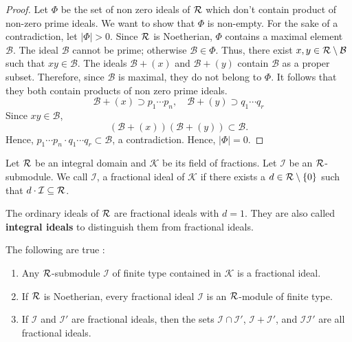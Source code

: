 \begin{proof}
  Let $\Phi$ be the set of non zero ideals of $\mathcal{R}$ which don't contain product of non-zero prime ideals. We want to show that $\Phi$ is non-empty. For the sake of a contradiction, let $|\Phi|>0$. Since $\mathcal{R}$ is Noetherian, $\Phi$ contains a maximal element $\mathcal{B}$. The ideal $\mathcal{B}$ cannot be prime; otherwise $\mathcal{B}\in \Phi$. Thus, there exist $x,y\in \mathcal{R}\setminus\mathcal{B}$ such that $xy\in \mathcal{B}$. The ideals $\mathcal{B}+(x)$ and
   $\mathcal{B}+(y)$ contain $\mathcal{B}$ as a proper subset. Therefore, since $\mathcal{B}$ is maximal, they do not belong to $\Phi$. It follows that they both contain products of non zero prime ideals.
   \[\mathcal{B} + (x)\supset p_1\cdots p_n, \quad \mathcal{B}+(y)\supset q_1\cdots q_r\]
   Since $xy\in \mathcal{B}$,
   \[(\mathcal{B}+(x))(\mathcal{B}+(y))\subset \mathcal{B}.\]
   Hence, $p_1\cdots p_n\cdot q_1\cdots q_r \subset \mathcal{B}$, a contradiction. Hence, $|\Phi|=0$.
\end{proof}


\begin{definition}
  Let $\mathcal{R}$ be an integral domain and $\mathcal{K}$ be its field of fractions. Let $\mathcal{I}$ be an $\mathcal{R}$-submodule. We call $\mathcal{I}$, a fractional ideal of $\mathcal{K}$ if there exists a $d\in \mathcal{R}\setminus\{0\}$ such that $d\cdot \mathcal{I}\subseteq \mathcal{R}$.
\end{definition}
  The ordinary ideals of $\mathcal{R}$ are fractional ideals with $d=1$. They are also called \textbf{integral ideals} to distinguish them from fractional ideals.

\begin{prop}
  The following are true :
  \begin{enumerate}
    \item Any $\mathcal{R}$-submodule $\mathcal{I}$ of finite type contained in $\mathcal{K}$ is a fractional ideal.

    \item If $\mathcal{R}$ is Noetherian, every fractional ideal $\mathcal{I}$ is an $\mathcal{R}$-module of finite type.

    \item If $\mathcal{I}$ and $\mathcal{I}'$ are fractional ideals, then the sets $\mathcal{I}\cap \mathcal{I}'$, $\mathcal{I}+\mathcal{I}'$, and $\mathcal{I}\mathcal{I}'$ are all fractional ideals.
  \end{enumerate}
\end{prop}

